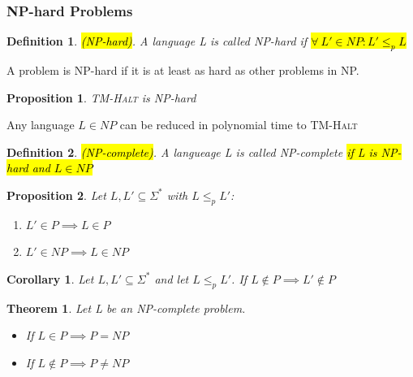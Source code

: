 \documentclass[a3paper, 8pt]{extarticle}
\newtheorem{theorem}{Theorem}[section]
\newtheorem{corollary}{Corollary}[theorem]
\newtheorem{proposition}{Proposition}[section]
\newtheorem*{definition}{Definition}
\begin{document}
\begin{multicols*}{6}
\subsubsection{NP-hard Problems}
\begin{definition}
    \hl{(NP-hard)}. A language L is called NP-hard if \hl{$\forall \ L' \in NP: L' \leq_p L$}
\end{definition}

A problem is NP-hard if it is at least as hard as other problems in NP.

\begin{proposition}
    \textsc{TM-Halt} is NP-hard
\end{proposition}

Any language $L \in NP$ can be reduced in polynomial time to \textsc{TM-Halt}


\begin{definition}
    \hl{(NP-complete)}. A langueage L is called NP-complete \hl{if L is NP-hard and $L \in NP$}
\end{definition}

\begin{proposition}
    Let $L,L'\subseteq \Sigma^*$ with $L\leq_p L'$:\begin{enumerate}
        \item $L' \in P \implies L \in P$
        \item $L' \in NP \implies L \in NP$
    \end{enumerate}
\end{proposition}

\begin{corollary}
    Let $L,L'\subseteq \Sigma^*$ and let $L\leq_p L'$. If $L \notin P \implies L' \notin P$
\end{corollary}


\begin{theorem}
    Let L be an NP-complete problem. \begin{itemize}
        \item If $L \in P \implies P = NP$
        \item If $L \notin P \implies P \neq NP$
    \end{itemize}
\end{theorem}

\end{multicols*}
\end{document}
